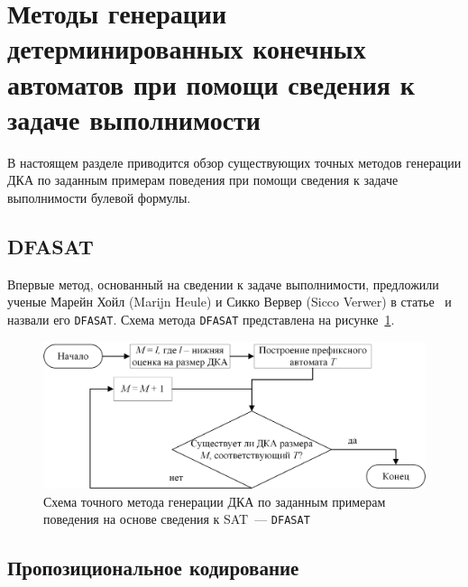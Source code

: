 


\section{Методы генерации детерминированных конечных автоматов при помощи сведения к задаче выполнимости} 
\label{sec:review:sat-dfa-inf} 

В настоящем разделе приводится обзор существующих точных методов генерации ДКА по заданным примерам поведения при помощи сведения к задаче выполнимости булевой формулы.

\subsection{DFASAT}
\label{sec:review:sat-dfa-inf:dfasat}

Впервые метод, основанный на сведении к задаче выполнимости, предложили ученые Марейн Хойл (Marijn Heule) и Сикко Вервер (Sicco Verwer) в статье~\cite{heule-icgi10} и назвали его \texttt{DFASAT}.
Схема метода \texttt{DFASAT} представлена на рисунке~\ref{img:dfasat-algo}.


\begin{figure}[ht]
  \centering
  \includegraphics[scale=0.7]{img/ntv/basic.jpg}
  \caption{Схема точного метода генерации ДКА по заданным примерам поведения на основе сведения к SAT~--- \texttt{DFASAT}}
  \label{img:dfasat-algo}
\end{figure}


\subsection{Пропозициональное кодирование}
\label{sec:review:sat-dfa-inf:hv-encoding}


